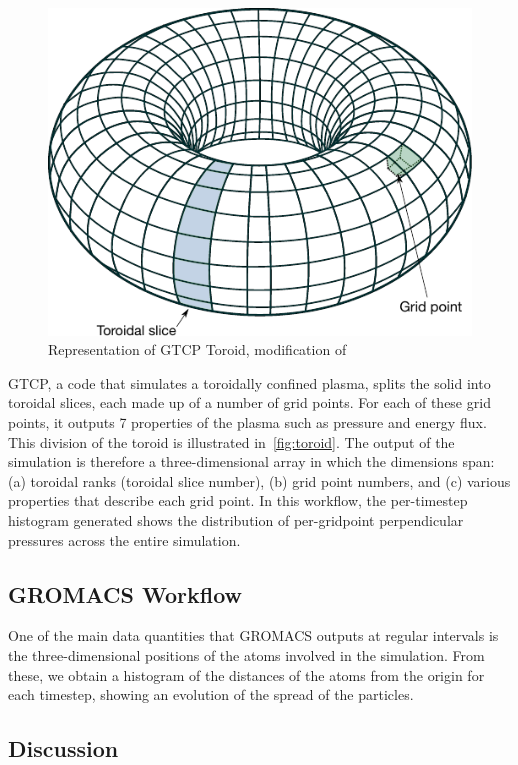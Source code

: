 \begin{figure}
  \centering
  \vspace{-0.10in}
  \includegraphics[width=0.7\columnwidth]{fig/Simple_Torus_mod}
  \vspace{-0.09in}
  \caption{Representation of GTCP Toroid, modification of \cite{WikimediaCommons:torus}}
  \label{fig:toroid}
  \vspace{-0.20in}
\end{figure}

GTCP, a code that simulates a toroidally confined plasma, splits the solid into
toroidal slices, each made up of a number of grid points. For each of these
grid points, it outputs 7 properties of the plasma such as pressure and energy
flux. This division of the toroid is illustrated in~\autoref{fig:toroid}.
The output of the simulation is therefore a three-dimensional array in which
the dimensions span: (a) toroidal ranks (toroidal slice number), (b) grid point
numbers, and (c) various properties that describe each grid point.
In this workflow, the per-timestep histogram
generated shows the distribution of per-gridpoint perpendicular pressures across
the entire simulation.

\subsection{GROMACS Workflow}

One of the main data quantities that GROMACS outputs
at regular intervals is the three-dimensional positions
of the atoms involved in the simulation.
From these, we obtain a histogram of the distances
of the atoms from the origin for each timestep, showing
an evolution of the spread of the particles.

\subsection{Discussion}

